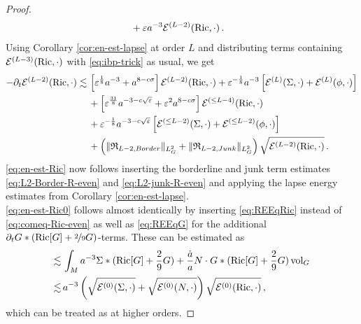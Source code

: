 \documentclass[11pt,leqno,textwidth=10cm]{amsart}
\numberwithin{equation}{section}
\theoremstyle{definition}
\theoremstyle{plain}
\newcommand{\1}{\mathbbm{1}}
\newcommand{\E}{\mathcal{E}}
\newcommand{\Ric}{\text{\normalfont{Ric}}}
\newcommand{\vol}[1]{{\text{\normalfont{vol}}}_{#1}}
\renewcommand{\epsilon}{\varepsilon}
\newcommand{\del}{\partial}
\begin{document}
\begin{proof}
\begin{align*}
&\,+\epsilon a^{-3}\E^{(L-2)}(\Ric,\cdot)\,.
\end{align*}
Using Corollary \ref{cor:en-est-lapse} at order $L$ and distributing terms containing $\E^{(L-3)}(\Ric,\cdot)$ with \eqref{eq:ibp-trick} as usual, we get
\begin{align*}
-\del_t\E^{(L-2)}(\Ric,\cdot)\lesssim&\,\left[\epsilon^{\frac18} a^{-3}+a^{8-c\sigma}\right]\E^{(L-2)}(\Ric,\cdot)+\epsilon^{-\frac18}a^{-3}\left[\E^{(L)}(\Sigma,\cdot)+\E^{(L)}(\phi,\cdot)\right]\\
&\,+\left[\epsilon^\frac{31}8a^{-3-c\sqrt{\epsilon}}+\epsilon^2a^{8-c\sigma}\right]\E^{(\leq L-4)}(\Ric,\cdot)\\
&\,+\epsilon^{-\frac18}a^{-3-c\sqrt{\epsilon}}\left[\E^{(\leq L-2)}(\Sigma,\cdot)+\E^{(\leq L-2)}(\phi,\cdot)\right]\\
&\,+\left(\|\mathfrak{R}_{L-2,Border}\|_{L^2_G}+\|\mathfrak{R}_{L-2,Junk}\|_{L^2_G}\right)\sqrt{\E^{(L-2)}(\Ric,\cdot)}\,.
\end{align*}
\eqref{eq:en-est-Ric} now follows inserting the borderline and junk term estimates \eqref{eq:L2-Border-R-even} and \eqref{eq:L2-junk-R-even} and applying the lapse energy estimates from Corollary \ref{cor:en-est-lapse}.\\
\eqref{eq:en-est-Ric0} follows almost identically by inserting \eqref{eq:REEqRic} instead of \eqref{eq:comeq-Ric-even} as well as \eqref{eq:REEqG} for the additional $\del_tG\ast(\Ric[G]+\nicefrac29G)$-terms. These can be estimated as
\begin{align*}
\lesssim&\,\int_Ma^{-3}\Sigma\ast(\Ric[G]+\frac29G)+\frac{\dot{a}}a N\cdot G\ast(\Ric[G]+\frac29G)\,\vol{G}\\
\lesssim&\,a^{-3}\left(\sqrt{\E^{(0)}(\Sigma,\cdot)}+\sqrt{\E^{(0)}(N,\cdot)}\right)\sqrt{\E^{(0)}(\Ric,\cdot)}\,,
\end{align*}
which can be treated as at higher orders.
\end{proof}
\end{document}
